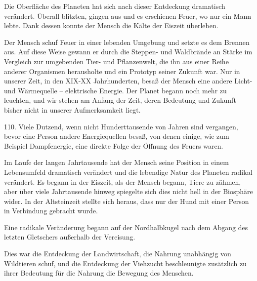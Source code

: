 \documentclass[11pt,a4paper]{book}
\begin{document}
Die Oberfläche des Planeten hat sich nach dieser Entdeckung dramatisch verändert. Überall blitzten, gingen aus und es erschienen Feuer, wo nur ein Mann lebte. Dank dessen konnte der Mensch die Kälte der Eiszeit überleben.



Der Mensch schuf Feuer in einer lebenden Umgebung und setzte es dem Brennen aus. Auf diese Weise gewann er durch die Steppen- und Waldbrände an Stärke im Vergleich zur umgebenden Tier- und Pflanzenwelt, die ihn aus einer Reihe anderer Organismen herausholte und ein Prototyp seiner Zukunft war. Nur in unserer Zeit, in den XIX-XX Jahrhunderten, besaß der Mensch eine andere Licht- und Wärmequelle -- elektrische Energie. Der Planet begann noch mehr zu leuchten, und wir stehen am Anfang der Zeit, deren Bedeutung und Zukunft bisher nicht in unserer Aufmerksamkeit liegt.



110. Viele Dutzend, wenn nicht Hunderttausende von Jahren sind vergangen, bevor eine Person andere Energiequellen besaß, von denen einige, wie zum Beispiel Dampfenergie, eine direkte Folge der Öffnung des Feuers waren.



Im Laufe der langen Jahrtausende hat der Mensch seine Position in einem Lebensumfeld dramatisch verändert und die lebendige Natur des Planeten radikal verändert. Es begann in der Eiszeit, als der Mensch begann, Tiere zu zähmen, aber über viele Jahrtausende hinweg spiegelte sich dies nicht hell in der Biosphäre wider. In der Altsteinzeit stellte sich heraus, dass nur der Hund mit einer Person in Verbindung gebracht wurde.



Eine radikale Veränderung begann auf der Nordhalbkugel nach dem Abgang des letzten Gletschers außerhalb der Vereisung.



Dies war die Entdeckung der Landwirtschaft, die Nahrung unabhängig von Wildtieren schuf, und die Entdeckung der Viehzucht beschleunigte zusätzlich zu ihrer Bedeutung für die Nahrung die Bewegung des Menschen.
\end{document}
